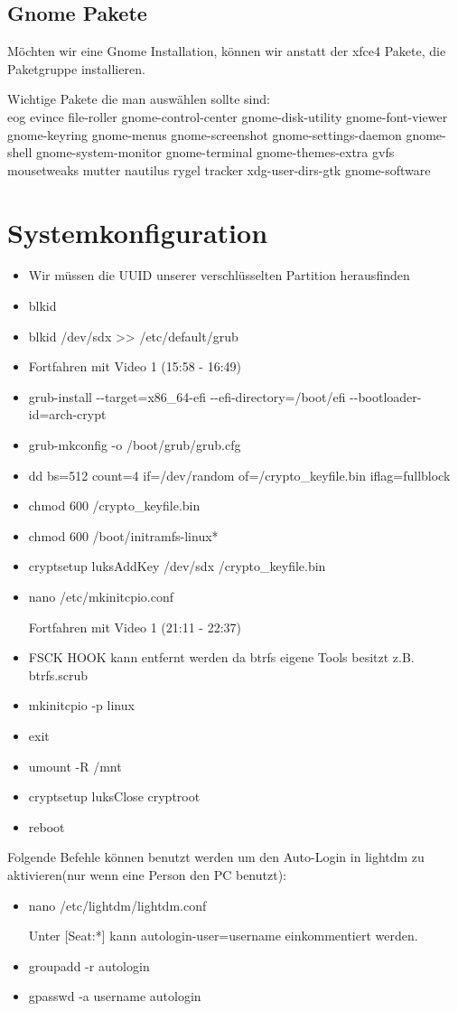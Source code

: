 \documentclass[11pt,a4paper]{article}
\begin{document}
\subsection{Gnome Pakete}
Möchten wir eine Gnome Installation, können wir anstatt der xfce4 Pakete, die Paketgruppe \textcolor{red}{} installieren.

Wichtige Pakete die man auswählen sollte sind:\\

eog evince file-roller gnome-control-center gnome-disk-utility gnome-font-viewer gnome-keyring gnome-menus gnome-screenshot gnome-settings-daemon gnome-shell gnome-system-monitor gnome-terminal  gnome-themes-extra gvfs mousetweaks mutter nautilus rygel tracker xdg-user-dirs-gtk gnome-software 
\section{Systemkonfiguration }
\begin{itemize}
\item Wir müssen die UUID unserer verschlüsselten Partition herausfinden
\item blkid
\item blkid /dev/sdx >{}> /etc/default/grub
\item Fortfahren mit Video 1 (15:58 - 16:49)
\item grub-install -{}-target=x86\_64-efi -{}-efi-directory=/boot/efi -{}-bootloader-id=arch-crypt 
\item grub-mkconfig -o /boot/grub/grub.cfg
\item dd bs=512 count=4 if=/dev/random of=/crypto\_keyfile.bin iflag=fullblock
\item chmod 600 /crypto\_keyfile.bin
\item chmod 600 /boot/initramfs-linux*
\item cryptsetup luksAddKey /dev/sdx /crypto\_keyfile.bin
\item nano /etc/mkinitcpio.conf

Fortfahren mit Video 1 (21:11 - 22:37)
\item FSCK HOOK kann entfernt werden da btrfs eigene Tools besitzt z.B. btrfs.scrub
\item mkinitcpio -p linux
\item exit
\item umount -R /mnt
\item cryptsetup luksClose cryptroot
\item reboot
\end{itemize}
Folgende Befehle können benutzt werden um den Auto-Login in lightdm zu aktivieren(nur wenn eine Person den PC benutzt):
\begin{itemize}
\item nano /etc/lightdm/lightdm.conf

Unter [Seat:*] kann autologin-user=username einkommentiert werden.
\item groupadd -r autologin
\item gpasswd -a username autologin 
\end{itemize}
\end{document}
